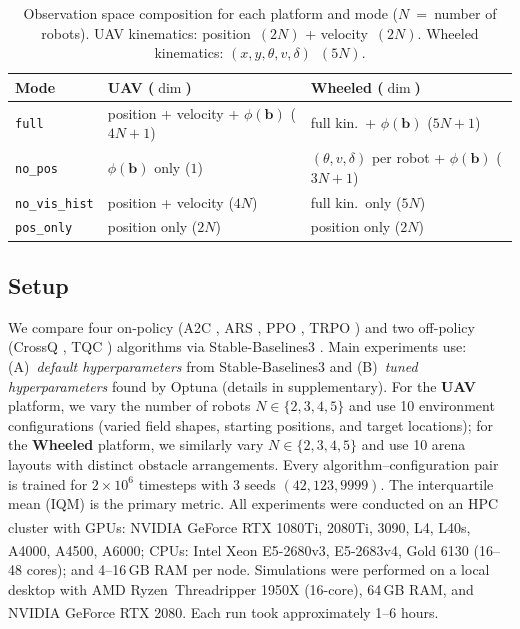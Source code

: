 \documentclass{article}
\begin{document}
\begin{table}[h]
\centering
\footnotesize
\caption{\small Observation space composition for each platform and mode ($N$~=~number of robots). UAV kinematics: position~$(2N)$ + velocity~$(2N)$. Wheeled kinematics: $(x,y,\theta,v,\delta)$~$(5N)$.}
\label{tab:obs_modes}
\begin{tabular}{l|ll}
    \toprule
    \textbf{Mode} & \textbf{UAV ($\dim$)} & \textbf{Wheeled ($\dim$)} \\
    \midrule
    \texttt{full}        & position + velocity + $\phi(\mathbf{b})$ ($4N+1$) & full kin.\ + $\phi(\mathbf{b})$ ($5N+1$) \\
    \texttt{no\_pos}     & $\phi(\mathbf{b})$ only ($1$) & $(\theta,v,\delta)$ per robot + $\phi(\mathbf{b})$ ($3N+1$) \\
    \texttt{no\_vis\_hist} & position + velocity ($4N$) & full kin.\ only ($5N$) \\
    \texttt{pos\_only}   & position only ($2N$) & position only ($2N$) \\
    \bottomrule
\end{tabular}
\end{table}

\subsection{Setup}
\label{sec:exp:setup}

We compare four on-policy (A2C \citep{mnih2016a2c}, ARS \citep{mania2018ars}, PPO \citep{schulman2017ppo}, TRPO \citep{schulman2015trust}) and two off-policy (CrossQ \citep{bhatt2024crossq}, TQC \citep{kuznetsov2020tqc}) algorithms via Stable-Baselines3 \citep{stable-baselines3}. Main experiments use: (A)~\textit{default hyperparameters} from Stable-Baselines3 and (B)~\textit{tuned hyperparameters} found by Optuna \citep{optuna_2019} (details in supplementary). For the \textbf{UAV} platform, we vary the number of robots $N \in \{2, 3, 4, 5\}$ and use 10 environment configurations (varied field shapes, starting positions, and target locations); for the \textbf{Wheeled} platform, we similarly vary $N \in \{2, 3, 4, 5\}$ and use 10 arena layouts with distinct obstacle arrangements. Every algorithm--configuration pair is trained for $2\!\times\!10^6$ timesteps with 3 seeds $(42, 123, 9999)$. The interquartile mean (IQM) \citep{agarwal2021deep} is the primary metric. All experiments were conducted on an HPC cluster with GPUs: NVIDIA\textsuperscript{\textregistered} GeForce RTX 1080Ti, 2080Ti, 3090, L4, L40s, A4000, A4500, A6000; CPUs: Intel\textsuperscript{\textregistered} Xeon\textsuperscript{\textregistered} E5-2680v3, E5-2683v4, Gold 6130 (16--48 cores); and 4--16\,GB RAM per node. Simulations were performed on a local desktop with AMD Ryzen\texttrademark\ Threadripper 1950X (16-core), 64\,GB RAM, and NVIDIA\textsuperscript{\textregistered} GeForce RTX 2080. Each run took approximately 1--6 hours.
\end{document}
